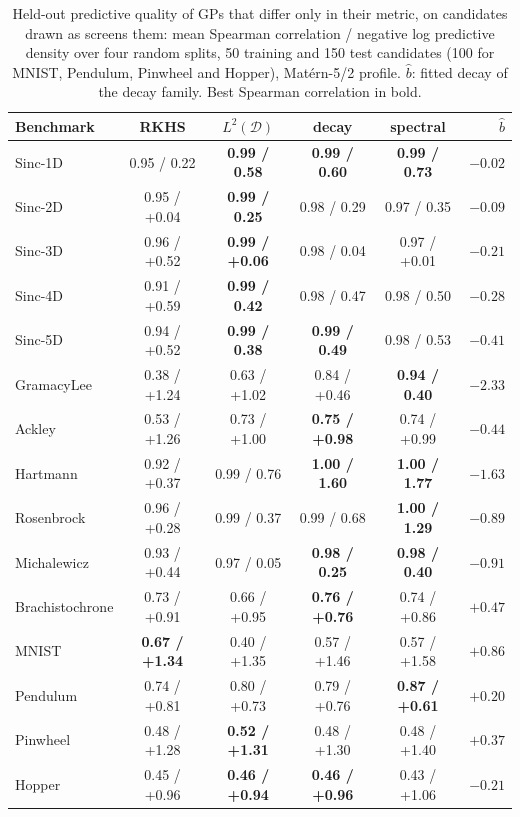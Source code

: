 \begin{table}[t]
\centering
\caption{Held-out predictive quality of GPs that differ only in their metric, on candidates drawn as \lzero{} screens them: mean Spearman correlation / negative log predictive density over four random splits, 50 training and 150 test candidates (100 for MNIST, Pendulum, Pinwheel and Hopper), Matérn-5/2 profile. $\hat b$: fitted decay of the decay family. Best Spearman correlation in bold.}
\label{tab:diagnostic}
\footnotesize
\setlength{\tabcolsep}{3pt}
\begin{tabular}{lccccr}
\toprule
Benchmark & RKHS & $L^2(\mathcal{D})$ & decay & spectral & $\hat b$ \\
\midrule
Sinc-1D & 0.95 / \textminus{}0.22 & \textbf{0.99 / \textminus{}0.58} & \textbf{0.99 / \textminus{}0.60} & \textbf{0.99 / \textminus{}0.73} & $-0.02$ \\
Sinc-2D & 0.95 / +0.04 & \textbf{0.99 / \textminus{}0.25} & 0.98 / \textminus{}0.29 & 0.97 / \textminus{}0.35 & $-0.09$ \\
Sinc-3D & 0.96 / +0.52 & \textbf{0.99 / +0.06} & 0.98 / \textminus{}0.04 & 0.97 / +0.01 & $-0.21$ \\
Sinc-4D & 0.91 / +0.59 & \textbf{0.99 / \textminus{}0.42} & 0.98 / \textminus{}0.47 & 0.98 / \textminus{}0.50 & $-0.28$ \\
Sinc-5D & 0.94 / +0.52 & \textbf{0.99 / \textminus{}0.38} & \textbf{0.99 / \textminus{}0.49} & 0.98 / \textminus{}0.53 & $-0.41$ \\
GramacyLee & 0.38 / +1.24 & 0.63 / +1.02 & 0.84 / +0.46 & \textbf{0.94 / \textminus{}0.40} & $-2.33$ \\
Ackley & 0.53 / +1.26 & 0.73 / +1.00 & \textbf{0.75 / +0.98} & 0.74 / +0.99 & $-0.44$ \\
Hartmann & 0.92 / +0.37 & 0.99 / \textminus{}0.76 & \textbf{1.00 / \textminus{}1.60} & \textbf{1.00 / \textminus{}1.77} & $-1.63$ \\
Rosenbrock & 0.96 / +0.28 & 0.99 / \textminus{}0.37 & 0.99 / \textminus{}0.68 & \textbf{1.00 / \textminus{}1.29} & $-0.89$ \\
Michalewicz & 0.93 / +0.44 & 0.97 / \textminus{}0.05 & \textbf{0.98 / \textminus{}0.25} & \textbf{0.98 / \textminus{}0.40} & $-0.91$ \\
Brachistochrone & 0.73 / +0.91 & 0.66 / +0.95 & \textbf{0.76 / +0.76} & 0.74 / +0.86 & $+0.47$ \\
MNIST & \textbf{0.67 / +1.34} & 0.40 / +1.35 & 0.57 / +1.46 & 0.57 / +1.58 & $+0.86$ \\
Pendulum & 0.74 / +0.81 & 0.80 / +0.73 & 0.79 / +0.76 & \textbf{0.87 / +0.61} & $+0.20$ \\
Pinwheel & 0.48 / +1.28 & \textbf{0.52 / +1.31} & 0.48 / +1.30 & 0.48 / +1.40 & $+0.37$ \\
Hopper & 0.45 / +0.96 & \textbf{0.46 / +0.94} & \textbf{0.46 / +0.96} & 0.43 / +1.06 & $-0.21$ \\
\bottomrule
\end{tabular}
\end{table}
